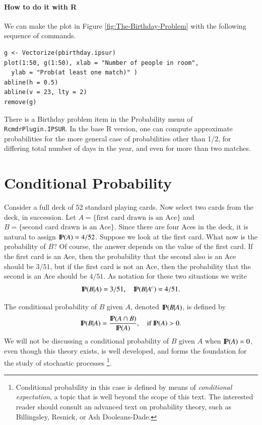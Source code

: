 \documentclass[captions=tableheading]{scrbook}
\begin{document}
\paragraph*{How to do it with \textsf{R}}

We can make the plot in Figure \ref{fig:The-Birthday-Problem} with the following sequence of commands.


\begin{verbatim}
g <- Vectorize(pbirthday.ipsur)
plot(1:50, g(1:50), xlab = "Number of people in room", 
  ylab = "Prob(at least one match)" )
abline(h = 0.5)
abline(v = 23, lty = 2)
remove(g)
\end{verbatim}

There is a \textsf{Birthday problem} item in the \textsf{Probability} menu of \texttt{RcmdrPlugin.IPSUR}. In the base \textsf{R} version, one can compute approximate probabilities for the more general case of probabilities other than 1/2, for differing total number of days in the year, and even for more than two matches.
\section{Conditional Probability}
\label{sec-4-6}

\label{sec:Conditional-Probability}

Consider a full deck of 52 standard playing cards. Now select two cards from the deck, in succession. Let \( A = \{ \mbox{first card drawn is an Ace} \} \) and \( B = \{ \mbox{second card drawn is an Ace} \} \). Since there are four Aces in the deck, it is natural to assign \( \P(A) = 4/52 \). Suppose we look at the first card. What now is the probability of \(B\)? Of course, the answer depends on the value of the first card. If the first card is an Ace, then the probability that the second also is an Ace should be \( 3/51 \), but if the first card is not an Ace, then the probability that the second is an Ace should be \( 4/51 \). As notation for these two situations we write
\[
\P(B|A)=3/51,\quad\P(B|A^{c})=4/51.
\]

\begin{defn}
The conditional probability of \(B\) given \(A\), denoted \(\P(B|A)\), is defined by
\begin{equation}
\P(B|A)=\frac{\P(A\cap B)}{\P(A)},\quad\mbox{if }\P(A)>0.
\end{equation}
We will not be discussing a conditional probability of \(B\) given \(A\) when \(\P(A)=0\), even though this theory exists, is well developed, and forms the foundation for the study of stochastic processes
\footnote{Conditional probability in this case is defined by means of \emph{conditional expectation}, a topic that is well beyond the scope of this text. The interested reader should consult an advanced text on probability theory, such as Billingsley, Resnick, or Ash Dooleans-Dade.}.
\end{defn}
\end{document}
